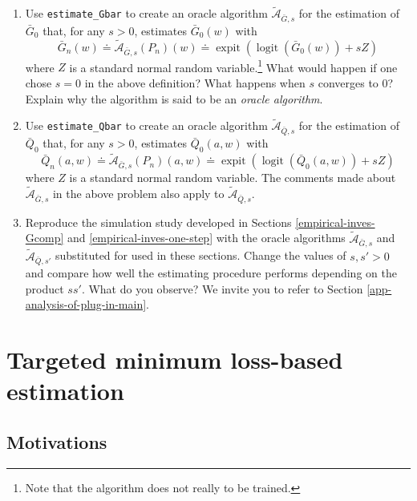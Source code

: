 \documentclass[
  11pt,
  openright,twoside]{book}
\DeclareMathOperator{\expit}{expit}
\DeclareMathOperator{\logit}{logit}
\newcommand{\Algora}{\widetilde{\mathcal{A}}}
\newcommand{\defq}{\doteq}
\newcommand{\Gbar}{\bar{G}}
\newcommand{\Qbar}{\bar{Q}}
\theoremstyle{definition}
\theoremstyle{definition}
\theoremstyle{definition}
\theoremstyle{definition}
\theoremstyle{remark}
\begin{document}
\begin{enumerate}
\def\labelenumi{\arabic{enumi}.}
\item
  Use \texttt{estimate\_Gbar} to create an oracle algorithm \(\Algora_{\Gbar,s}\) for
  the estimation of \(\Gbar_{0}\) that, for any \(s > 0\), estimates
  \(\Gbar_{0}(w)\) with \begin{equation*}    \Gbar_{n}(w)   \defq
  \Algora_{\Gbar,s}                     (P_{n})(w)                    \defq
  \expit\left(\logit\left(\Gbar_{0}(w)\right) +  s Z\right) \end{equation*}
  where \(Z\) is a standard normal random variable.\footnote{Note that the algorithm
    does not really to be trained.} What would happen if one chose \(s=0\) in the
  above definition? What happens when \(s\) converges to 0? Explain why the algorithm
  is said to be an \emph{oracle algorithm}.
\item
  Use \texttt{estimate\_Qbar} to create an oracle algorithm \(\Algora_{\Qbar,s}\) for
  the estimation of \(\Qbar_{0}\) that, for any \(s > 0\), estimates
  \(\Qbar_{0}(a,w)\) with \begin{equation*}    \Qbar_{n}(a,w)   \defq
  \Algora_{\Gbar,s}                     (P_{n})(a,w)                    \defq 
  \expit\left(\logit\left(\Qbar_{0}(a,w)\right) +  s Z\right) \end{equation*}
  where \(Z\) is a standard normal random variable. The comments made about
  \(\Algora_{\Gbar,s}\) in the above problem also apply to \(\Algora_{\Qbar,s}\).
\item
  Reproduce the simulation study developed in Sections \ref{empirical-inves-Gcomp}
  and \ref{empirical-inves-one-step} with the oracle algorithms \(\Algora_{\Gbar,s}\)
  and \(\Algora_{\Qbar,s'}\) substituted for used in these sections. Change the values
  of \(s,s' > 0\) and compare how well the estimating procedure performs depending on the product \(ss'\).
  What do you observe? We invite you to refer to Section \ref{app-analysis-of-plug-in-main}.
\end{enumerate}

\hypertarget{TMLE}{%
\chapter{Targeted minimum loss-based estimation}\label{TMLE}}

\hypertarget{TMLE-motivations}{%
\section{Motivations}\label{TMLE-motivations}}
\end{document}
